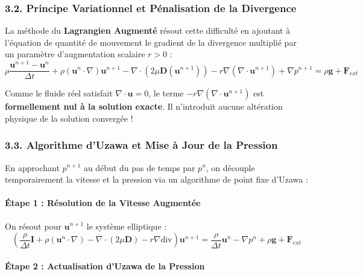 \documentclass[
  french,
]{article}
\begin{document}
\subsubsection{3.2. Principe Variationnel et Pénalisation de la
Divergence}\label{principe-variationnel-et-puxe9nalisation-de-la-divergence}

La méthode du \textbf{Lagrangien Augmenté} résout cette difficulté en
ajoutant à l'équation de quantité de mouvement le gradient de la
divergence multiplié par un paramètre d'augmentation scalaire \(r > 0\)
:
\[\rho \frac{\mathbf{u}^{n+1} - \mathbf{u}^n}{\Delta t} + \rho (\mathbf{u}^n \cdot \nabla)\mathbf{u}^{n+1} - \nabla \cdot \left( 2 \mu \mathbf{D}(\mathbf{u}^{n+1}) \right) - r \nabla (\nabla \cdot \mathbf{u}^{n+1}) + \nabla p^{n+1} = \rho \mathbf{g} + \mathbf{F}_{ext}\]

Comme le fluide réel satisfait \(\nabla \cdot \mathbf{u} = 0\), le terme
\(-r \nabla (\nabla \cdot \mathbf{u}^{n+1})\) est \textbf{formellement
nul à la solution exacte}. Il n'introduit aucune altération physique de
la solution convergée !

\subsubsection{3.3. Algorithme d'Uzawa et Mise à Jour de la
Pression}\label{algorithme-duzawa-et-mise-uxe0-jour-de-la-pression}

En approchant \(p^{n+1}\) au début du pas de temps par \(p^n\), on
découple temporairement la vitesse et la pression via un algorithme de
point fixe d'Uzawa :

\paragraph{Étape 1 : Résolution de la Vitesse
Augmentée}\label{uxe9tape-1-ruxe9solution-de-la-vitesse-augmentuxe9e}

On résout pour \(\mathbf{u}^{n+1}\) le système elliptique :
\[\left( \frac{\rho}{\Delta t} \mathbf{I} + \rho (\mathbf{u}^n \cdot \nabla) - \nabla \cdot (2\mu \mathbf{D}) - r \nabla \text{div} \right) \mathbf{u}^{n+1} = \frac{\rho}{\Delta t} \mathbf{u}^n - \nabla p^n + \rho \mathbf{g} + \mathbf{F}_{ext}\]

\paragraph{Étape 2 : Actualisation d'Uzawa de la
Pression}\label{uxe9tape-2-actualisation-duzawa-de-la-pression}
\end{document}
